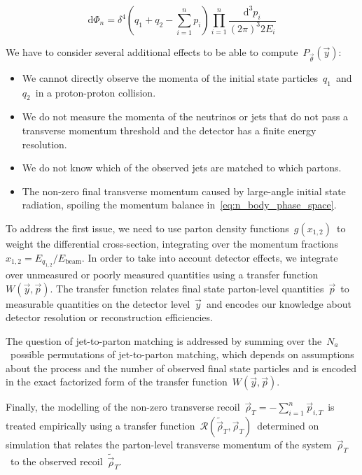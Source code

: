 \begin{equation}
\label{eq:n_body_phase_space}
\mathrm{d}\Phi_n = \delta^4 (q_1 + q_2 - \sum_{i=1}^n p_i) \prod_{i=1}^n \frac{\mathrm{d}^3 p_i}{(2\pi)^3 2 E_i}
\end{equation}

We have to consider several additional effects to be able to compute~$P_{\vec{\theta}}(\vec{y})$:
\begin{itemize}
\item We cannot directly observe the momenta of the initial state particles~$q_1$~and~$q_2$~in a proton-proton collision.
\item We do not measure the momenta of the neutrinos or jets that do not pass a transverse momentum threshold and the detector has a finite energy resolution.
\item We do not know which of the observed jets are matched to which partons.
\item The non-zero final transverse momentum caused by large-angle initial state radiation, spoiling the momentum balance in~\cref{eq:n_body_phase_space}.
\end{itemize}

To address the first issue, we need to use parton density functions~$g(x_{1,2})$~to weight the differential cross-section, integrating over the momentum fractions~$x_{1,2} = E_{q_{1,2}}/E_{\mathrm{beam}}$.
In order to take into account detector effects, we integrate over unmeasured or poorly measured quantities using a transfer function~$W(\vec{y}, \vec{p})$.
The transfer function relates final state parton-level quantities~$\vec{p}$~to measurable quantities on the detector level~$\vec{y}$~and encodes our knowledge about detector resolution or reconstruction efficiencies.

The question of jet-to-parton matching is addressed by summing over the~$N_a$~possible permutations of jet-to-parton matching, which depends on assumptions about the process and the number of observed final state particles and is encoded in the exact factorized form of the transfer function~$W(\vec{y}, \vec{p})$.

Finally, the modelling of the non-zero transverse recoil~$\vec{\rho}_T = -\sum_{i=1}^n \vec{p}_{i,T}$~is treated empirically using a transfer function~$\mathcal{R}(\tilde{\vec{\rho}}_T, \vec{\rho}_T)$~determined on simulation that relates the parton-level transverse momentum of the system~$\vec{\rho}_T$~to the observed recoil~$\tilde{\vec{\rho}}_T$. 

